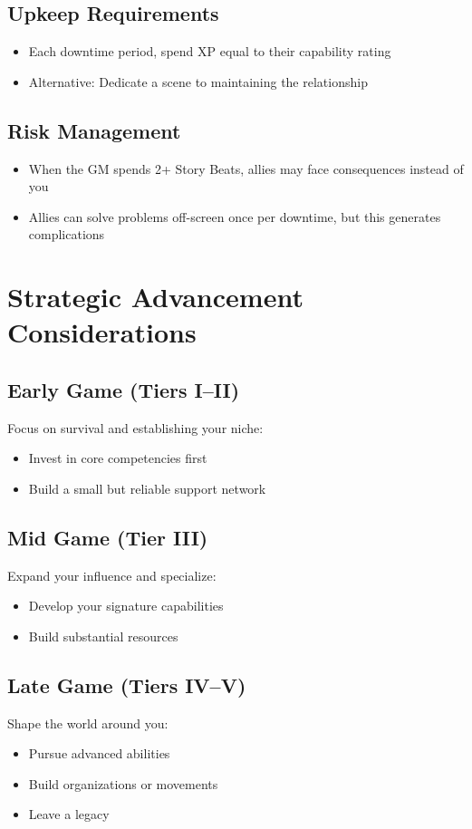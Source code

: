 \begin{multicols}{2}
\subsection*{Upkeep Requirements}
\begin{itemize}
\item Each downtime period, spend XP equal to their capability rating
\item Alternative: Dedicate a scene to maintaining the relationship
\end{itemize}

\subsection*{Risk Management}
\begin{itemize}
\item When the GM spends 2+ Story Beats, allies may face consequences instead of you
\item Allies can solve problems off-screen once per downtime, but this generates complications
\end{itemize}

\section{Strategic Advancement Considerations}

\subsection*{Early Game (Tiers I–II)}
Focus on survival and establishing your niche:
\begin{itemize}
\item Invest in core competencies first
\item Build a small but reliable support network
\end{itemize}

\subsection*{Mid Game (Tier III)}
Expand your influence and specialize:
\begin{itemize}
\item Develop your signature capabilities
\item Build substantial resources
\end{itemize}

\subsection*{Late Game (Tiers IV–V)}
Shape the world around you:
\begin{itemize}
\item Pursue advanced abilities
\item Build organizations or movements
\item Leave a legacy
\end{itemize}


\end{multicols}
